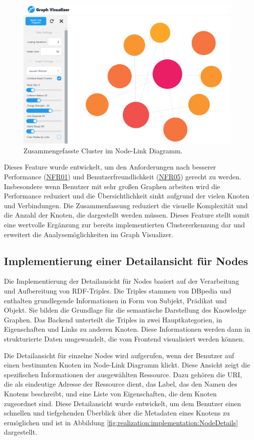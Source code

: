 \begin{figure}[h]
    \centering
    \includegraphics[height=.5\textwidth]{images/03/CombinedClusteringView.png}
    \caption{Zusammengefasste Cluster im Node-Link Diagramm.}
    \label{fig:realization:implementation:NodeLinkCombinedCluster}
\end{figure}

Dieses Feature wurde entwickelt, um den Anforderungen nach besserer Performance (\hyperref[NFR01]{NFR01}) und Benutzerfreundlichkeit (\hyperref[NFR05]{NFR05}) gerecht zu werden. Insbesondere wenn Benutzer mit sehr großen Graphen arbeiten wird die Performance reduziert und die Übersichtlichkeit sinkt aufgrund der vielen Knoten und Verbindungen. Die Zusammenfassung reduziert die visuelle Komplexität und die Anzahl der Knoten, die dargestellt werden müssen. Dieses Feature stellt somit eine wertvolle Ergänzung zur bereits implementierten Clustererkennung dar und erweitert die Analysemöglichkeiten im Graph Visualizer.

\subsection{Implementierung einer Detailansicht für Nodes}

Die Implementierung der Detailansicht für Nodes basiert auf der Verarbeitung und Aufbereitung von RDF-Triples. Die Triples stammen von DBpedia und enthalten grundlegende Informationen in Form von Subjekt, Prädikat und Objekt. Sie bilden die Grundlage für die semantische Darstellung des Knowledge Graphen. Das Backend unterteilt die Triples in zwei Hauptkategorien, in Eigenschaften und Links zu anderen Knoten. Diese Informationen werden dann in strukturierte Daten umgewandelt, die vom Frontend visualisiert werden können.

Die Detailansicht für einzelne Nodes wird aufgerufen, wenn der Benutzer auf einen bestimmten Knoten im Node-Link Diagramm klickt. Diese Ansicht zeigt die spezifischen Informationen der ausgewählten Ressource. Dazu gehören die URI, die als eindeutige Adresse der Ressource dient, das Label, das den Namen des Knotens beschreibt, und eine Liste von Eigenschaften, die dem Knoten zugeordnet sind. Diese Detailansicht wurde entwickelt, um dem Benutzer einen schnellen und tiefgehenden Überblick über die Metadaten eines Knotens zu ermöglichen und ist in Abbildung \ref{fig:realization:implementation:NodeDetails} dargestellt.

